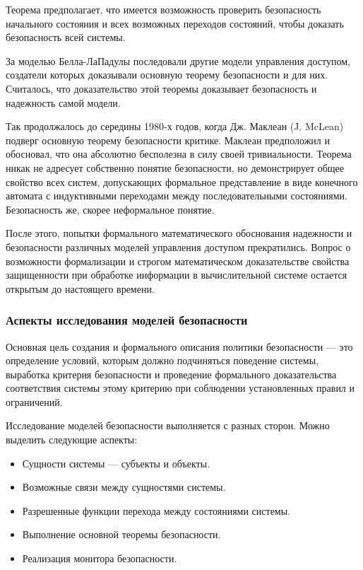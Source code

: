 Теорема предполагает, что имеется возможность проверить безопасность начального состояния и всех возможных переходов состояний, чтобы доказать безопасность всей системы.

За моделью Белла-ЛаПадулы последовали другие модели управления доступом, создатели которых доказывали основную теорему безопасности и для них. Считалось, что доказательство этой теоремы доказывает безопасность и надежность самой модели.

Так продолжалось до середины 1980-х годов, когда Дж. Маклеан (J. McLean) подверг основную теорему безопасности критике. Маклеан предположил и обосновал, что она абсолютно бесполезна в силу своей тривиальности. Теорема никак не адресует собственно понятие безопасности, но демонстрирует общее свойство всех систем, допускающих формальное представление в виде конечного автомата с индуктивными переходами между последовательными состояниями. Безопасность же, скорее неформальное понятие.

После этого, попытки формального математического обоснования надежности и безопасности различных моделей управления доступом прекратились. Вопрос о возможности формализации и строгом математическом доказательстве свойства защищенности при обработке информации в вычислительной системе остается открытым до настоящего времени.

\subsubsection{Аспекты исследования моделей безопасности}

Основная цель создания и формального описания политики безопасности --- это определение условий, которым должно подчиняться поведение системы, выработка критерия безопасности и проведение формального доказательства соответствия системы этому критерию при соблюдении установленных правил и ограничений.

Исследование моделей безопасности выполняется с разных сторон. Можно выделить следующие аспекты:

\begin{itemize}
	\item Сущности системы --- субъекты и объекты.
	\item Возможные связи между сущностями системы.
	\item Разрешенные функции перехода между состояниями системы.
	\item Выполнение основной теоремы безопасности.
	\item Реализация монитора безопасности.
\end{itemize}

